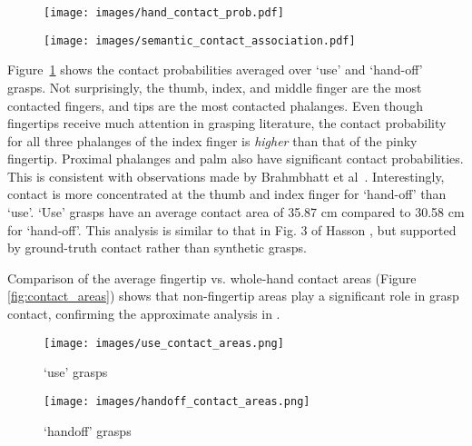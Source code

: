 \documentclass[runningheads]{llncs}
\begin{document}
\begin{figure*}
  \begin{subfigure}[b]{0.70\textwidth}
    \texttt{[image: images/hand\_contact\_prob.pdf]}
    \caption{}
    \label{fig:hand_contact_prob}
  \end{subfigure}
  \begin{subfigure}[b]{0.29\textwidth}
    \texttt{[image: images/semantic\_contact\_association.pdf]}
    \caption{}
    \label{fig:semantic_contact}
  \end{subfigure}
  \caption{(a) Hand contact probabilities estimated from the entire dataset. (b) Association of contacted binoculars points with fingers (top) and sets of phalanges at the same level of wrist proximity (bottom), \textbf{\textcolor{RoyalPurple}{indicated}} \textbf{\textcolor{Orange}{by}} \textbf{\textcolor{OliveGreen}{different}} \textbf{\textcolor{ProcessBlue}{colors}}.}
\end{figure*}

Figure~\ref{fig:hand_contact_prob} shows the contact probabilities averaged over `use' and `hand-off' grasps. Not surprisingly, the thumb, index, and middle finger are the most contacted fingers, and tips are the most contacted phalanges. Even though fingertips receive much attention in grasping literature, the contact probability for all three phalanges of the index finger is \emph{higher} than that of the pinky fingertip. Proximal phalanges and palm also have significant contact probabilities. This is consistent with observations made by Brahmbhatt et al~\cite{contactdbv1}. Interestingly, contact is more concentrated at the thumb and index finger for `hand-off' than `use'. `Use' grasps have an average contact area of 35.87 cm compared to 30.58 cm for `hand-off'. This analysis is similar to that in Fig. 3 of Hasson \etal \cite{learningJointReconstructionOfHandsAndManipulatedObjects}, but supported by ground-truth contact rather than synthetic grasps.

Comparison of the average fingertip vs. whole-hand contact areas (Figure \ref{fig:contact_areas}) shows that non-fingertip areas play a significant role in grasp contact, confirming the approximate analysis in \cite{contactdbv1}.

\begin{figure*}
  \begin{subfigure}{.51\textwidth}
    \texttt{[image: images/use\_contact\_areas.png]}
    \caption{`use' grasps}
  \end{subfigure}
  \hfill
  \begin{subfigure}{.48\textwidth}
    \texttt{[image: images/handoff\_contact\_areas.png]}
    \caption{`handoff' grasps}
  \end{subfigure}
  \caption{Comparing average fingertip (\textbf{\textcolor{red}{red}}) vs. whole-hand (\textbf{\textcolor{blue}{blue}}) contact areas.}
  \label{fig:contact_areas}
\end{figure*}
\end{document}
